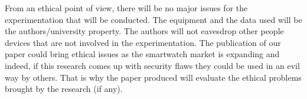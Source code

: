 From an ethical point of view, there will be no major issues for the experimentation that will be conducted. The equipment and the data used will be the authors/university property. The authors will not eavesdrop other people devices that are not involved in the experimentation.
The publication of our paper could bring ethical issues as the smartwatch market is expanding and indeed, if this research comes up with security flaws they could be used in an evil way by others. That is why the paper produced will evaluate the ethical problems brought by the research (if any).
